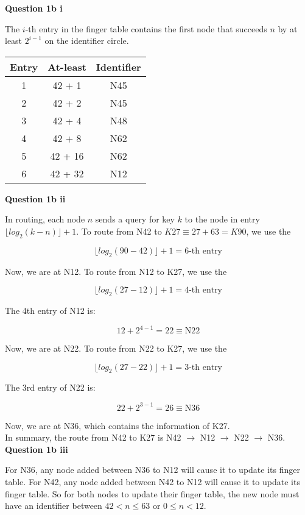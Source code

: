 \documentclass[11pt,a4paper]{report}
\begin{document}
\begin{multicols*}{2}
\noindent \textbf{Question 1b i}

\noindent The $i$-th entry in the finger table contains the first node that succeeds $n$ by at least $2^{i-1}$ on the identifier circle.

\begin{center}
\begin{tabular}{|c|c|c|}
  \hline
  Entry & At-least & Identifier \\ \hline
  1     & 42 + 1   & N45        \\
  2     & 42 + 2   & N45        \\
  3     & 42 + 4   & N48        \\
  4     & 42 + 8   & N62        \\
  5     & 42 + 16  & N62        \\
  6     & 42 + 32  & N12        \\ \hline
\end{tabular}
\end{center}

\noindent \textbf{Question 1b ii}

\noindent In routing, each node $n$ sends a query for key $k$ to the node in entry $\lfloor log_2(k-n) \rfloor + 1$. To route from N42 to $K27 \equiv 27 + 63 = K90$, we use the

$$\lfloor log_2(90-42) \rfloor + 1 = 6\text{-th entry}$$

\noindent Now, we are at N12. To route from N12 to K27, we use the

$$\lfloor log_2(27-12) \rfloor + 1 = 4\text{-th entry}$$

\noindent The 4th entry of N12 is:

$$12 + 2^{4-1} = 22 \equiv \text{N22}$$

\noindent Now, we are at N22. To route from N22 to K27, we use the

$$\lfloor log_2(27-22) \rfloor + 1 = 3\text{-th entry}$$

\noindent The 3rd entry of N22 is:

$$22 + 2^{3-1} = 26 \equiv \text{N36}$$

\noindent Now, we are at N36, which contains the information of K27. \\

\noindent In summary, the route from N42 to K27 is N42 $\rightarrow$ N12 $\rightarrow$ N22 $\rightarrow$ N36.\\

\noindent \textbf{Question 1b iii}

\noindent For N36, any node added between N36 to N12 will cause it to update its finger table. For N42, any node added between N42 to N12 will cause it to update its finger table. So for both nodes to update their finger table, the new node must have an identifier between $42<n\le 63$ or $0\le n <12$.

\end{multicols*}
\end{document}
